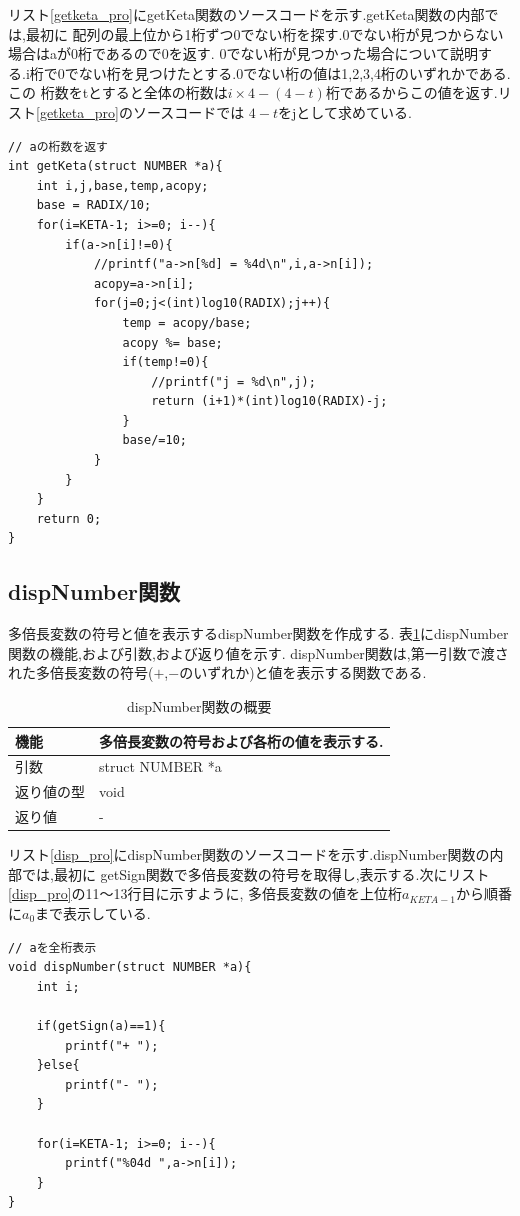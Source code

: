 \documentclass[a4j] {jarticle}
\begin{document}
  リスト\ref{getketa_pro}にgetKeta関数のソースコードを示す.getKeta関数の内部では,最初に
  配列の最上位から1桁ずつ0でない桁を探す.0でない桁が見つからない場合はaが0桁であるので0を返す.
  0でない桁が見つかった場合について説明する.i桁で0でない桁を見つけたとする.0でない桁の値は1,2,3,4桁のいずれかである.この
  桁数をtとすると全体の桁数は$i\times 4 -(4-t)$桁であるからこの値を返す.リスト\ref{getketa_pro}のソースコードでは
  $4-t$をjとして求めている.

  \begin{lstlisting}[basicstyle=\ttfamily\footnotesize, frame=single,label=getketa_pro,caption=getKeta関数のソースコード]
// aの桁数を返す
int getKeta(struct NUMBER *a){
    int i,j,base,temp,acopy;
    base = RADIX/10;
    for(i=KETA-1; i>=0; i--){
        if(a->n[i]!=0){
            //printf("a->n[%d] = %4d\n",i,a->n[i]);
            acopy=a->n[i];
            for(j=0;j<(int)log10(RADIX);j++){
                temp = acopy/base;
                acopy %= base;
                if(temp!=0){
                    //printf("j = %d\n",j);
                    return (i+1)*(int)log10(RADIX)-j;
                }
                base/=10;
            }
        }
    }
    return 0;
}
  \end{lstlisting}
\subsection{dispNumber関数}
多倍長変数の符号と値を表示するdispNumber関数を作成する.
表\ref{dispNumber}にdispNumber関数の機能,および引数,および返り値を示す.
dispNumber関数は,第一引数で渡された多倍長変数の符号($+$,$-$のいずれか)と値を表示する関数である.
\begin{table}[H]
  \caption{dispNumber関数の概要}
  \label{dispNumber}
  \begin{center}
      \begin{tabular}{|l|l|}\hline
      機能 & 多倍長変数の符号および各桁の値を表示する.\\ \hline
      引数 & struct NUMBER *a\\ \hline
      返り値の型 & void\\ \hline
      返り値 & -\\ \hline
      \end{tabular}
  \end{center}
  \end{table}

  リスト\ref{disp_pro}にdispNumber関数のソースコードを示す.dispNumber関数の内部では,最初に
  getSign関数で多倍長変数の符号を取得し,表示する.次にリスト\ref{disp_pro}の11～13行目に示すように,
  多倍長変数の値を上位桁$a_{KETA-1}$から順番に$a_0$まで表示している.
  \begin{lstlisting}[basicstyle=\ttfamily\footnotesize, frame=single,label=disp_pro,caption=dispNumber関数のソースコード]
// aを全桁表示
void dispNumber(struct NUMBER *a){
    int i;

    if(getSign(a)==1){
        printf("+ ");
    }else{
        printf("- ");
    }

    for(i=KETA-1; i>=0; i--){
        printf("%04d ",a->n[i]);
    }
}
  \end{lstlisting}
\end{document}
